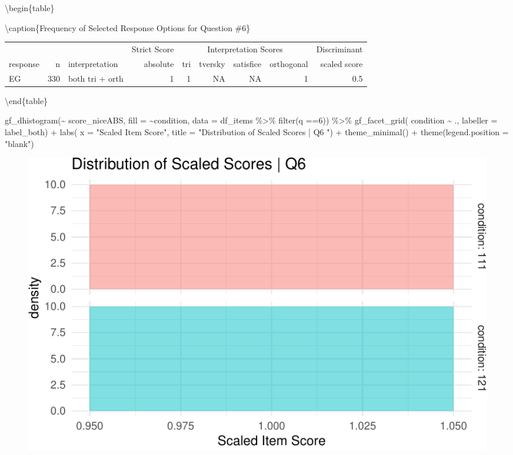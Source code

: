 \documentclass[
  letterpaper,
  DIV=11,
  numbers=noendperiod]{scrreprt}
\newenvironment{Shaded}{\begin{snugshade}}{\end{snugshade}}
\newcommand{\AttributeTok}[1]{\textcolor[rgb]{0.40,0.45,0.13}{#1}}
\newcommand{\DecValTok}[1]{\textcolor[rgb]{0.68,0.00,0.00}{#1}}
\newcommand{\FunctionTok}[1]{\textcolor[rgb]{0.28,0.35,0.67}{#1}}
\newcommand{\NormalTok}[1]{\textcolor[rgb]{0.00,0.23,0.31}{#1}}
\newcommand{\SpecialCharTok}[1]{\textcolor[rgb]{0.37,0.37,0.37}{#1}}
\newcommand{\StringTok}[1]{\textcolor[rgb]{0.13,0.47,0.30}{#1}}
\begin{document}
\textbackslash begin\{table\}

\textbackslash caption\{\label{tab:Q6-RESPONSES}Frequency of Selected
Response Options for Question \#6\} \centering

\begin{tabular}[t]{l|r|l|r|r|r|r|r|r}
\hline
\multicolumn{3}{c|}{ } & \multicolumn{1}{c|}{Strict Score} & \multicolumn{4}{c|}{Interpretation Scores} & \multicolumn{1}{c}{Discriminant} \\
\cline{4-4} \cline{5-8} \cline{9-9}
response & n & interpretation & absolute & tri & tversky & satisfice & orthogonal & scaled score\\
\hline
EG & 330 & both tri + orth & 1 & 1 & NA & NA & 1 & 0.5\\
\hline
\end{tabular}

\textbackslash end\{table\}

\begin{Shaded}
\begin{Highlighting}[]
\FunctionTok{gf\_dhistogram}\NormalTok{(}\SpecialCharTok{\textasciitilde{}}\NormalTok{ score\_niceABS, }\AttributeTok{fill =} \SpecialCharTok{\textasciitilde{}}\NormalTok{condition, }\AttributeTok{data =}\NormalTok{ df\_items }\SpecialCharTok{\%\textgreater{}\%} \FunctionTok{filter}\NormalTok{(q }\SpecialCharTok{==}\DecValTok{6}\NormalTok{)) }\SpecialCharTok{\%\textgreater{}\%} 
  \FunctionTok{gf\_facet\_grid}\NormalTok{( condition }\SpecialCharTok{\textasciitilde{}}\NormalTok{ ., }\AttributeTok{labeller =}\NormalTok{ label\_both) }\SpecialCharTok{+} 
  \FunctionTok{labs}\NormalTok{( }\AttributeTok{x =} \StringTok{"Scaled Item Score"}\NormalTok{, }\AttributeTok{title =} \StringTok{"Distribution of Scaled Scores | Q6 "}\NormalTok{) }\SpecialCharTok{+} 
  \FunctionTok{theme\_minimal}\NormalTok{() }\SpecialCharTok{+} \FunctionTok{theme}\NormalTok{(}\AttributeTok{legend.position =} \StringTok{"blank"}\NormalTok{)}
\end{Highlighting}
\end{Shaded}

\begin{figure}[H]

{\centering \includegraphics{analysis/SGC3A/2_sgc3A_scoring_files/figure-pdf/Q6-distribution-1.pdf}

}

\end{figure}
\end{document}
